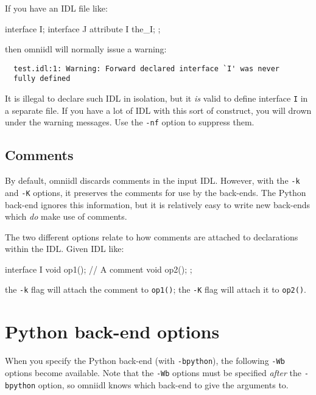 \documentclass[11pt,oneside,a4paper]{book}
\newcommand{\intf}[1]{\texttt{#1}}
\newcommand{\op}[1]{\texttt{#1()}}
\newcommand{\cmdline}[1]{\texttt{#1}}
\begin{document}
If you have an IDL file like:

\begin{idllisting}
interface I;
interface J {
  attribute I the_I;
};
\end{idllisting}

\noindent then omniidl will normally issue a warning:

{\small
\begin{verbatim}
  test.idl:1: Warning: Forward declared interface `I' was never
  fully defined
\end{verbatim}
}

\noindent It is illegal to declare such IDL in isolation, but it
\emph{is} valid to define interface \intf{I} in a separate file. If
you have a lot of IDL with this sort of construct, you will drown
under the warning messages. Use the \cmdline{-nf} option to suppress
them.


\subsection{Comments}

By default, omniidl discards comments in the input IDL. However, with
the \cmdline{-k} and \cmdline{-K} options, it preserves the comments
for use by the back-ends. The Python back-end ignores this
information, but it is relatively easy to write new back-ends which
\emph{do} make use of comments.

The two different options relate to how comments are attached to
declarations within the IDL. Given IDL like:

\begin{idllisting}
interface I {
  void op1();
  // A comment
  void op2();
};
\end{idllisting}

\noindent the \cmdline{-k} flag will attach the comment to \op{op1};
the \cmdline{-K} flag will attach it to \op{op2}.



\section{Python back-end options}
\label{sec:Wbglobal}

When you specify the Python back-end (with \cmdline{-bpython}), the
following \cmdline{-Wb} options become available. Note that the
\cmdline{-Wb} options must be specified \emph{after} the
\cmdline{-bpython} option, so omniidl knows which back-end to give the
arguments to.
\end{document}
